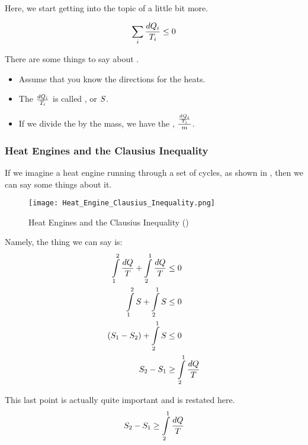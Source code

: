 Here, we start getting into the topic of  a little bit more.

\begin{equation}\label{eq:Clausius_Inequality}
  \sum\limits_{i} \frac{d Q_{i}}{T_{i}} \leq 0
\end{equation}

There are some things to say about .
\begin{itemize}[noitemsep]
\item Assume that you know the directions for the heats.
\item The $\frac{d Q_{i}}{T_{i}}$ is called , or $S$.
\item If we divide the  by the mass, we have the , $\frac{\frac{d Q_{i}}{T_{i}}}{m}$.
\end{itemize}

\subsubsection{Heat Engines and the Clausius Inequality}\label{subsubsec:Heat_Engine_Clausius_Inequality}
If we imagine a heat engine running through a set of cycles, as shown in , then we can say some things about it.

\begin{figure}[h!tbp]
  \centering
  \texttt{[image: Heat\_Engine\_Clausius\_Inequality.png]}
  \caption{Heat Engines and the Clausius Inequality (\cite[pg. 280]{ThermoTextbook})}
  \label{fig:Heat_Engine_Clausius_Inequality}
\end{figure}

Namely, the thing we can say is:
\begin{align*}
  \int\limits_{1}^{2} \frac{d Q}{T} + \int\limits_{2}^{1} \frac{d Q}{T} &\leq 0 \\
  \int\limits_{1}^{2} S + \int\limits_{2}^{1} S &\leq 0 \\
  (S_{1} - S_{2}) + \int\limits_{2}^{1} S &\leq 0 \\
  S_{2} - S_{1} &\geq \int\limits_{2}^{1} \frac{d Q}{T}
\end{align*}

This last point is actually quite important and is restated here.
\begin{equation}\label{eq:Reversible_Process_Entropy_Lost}
  S_{2} - S_{1} \geq \int\limits_{2}^{1} \frac{d Q}{T}
\end{equation}

